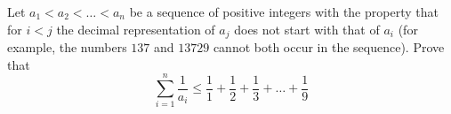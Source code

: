 Let $a_1<a_2< \ldots <a_n$ be a sequence of positive integers with the property that
for $i<j$ the decimal representation of $a_j$ does not start with that of $a_i$
(for example, the numbers $137$ and $13729$ cannot both occur in the sequence).
Prove that
$$\sum_{i=1}^n \frac{1}{a_i} \leq \frac{1}{1}+\frac{1}{2}+\frac{1}{3}+\ldots+\frac{1}{9}$$
